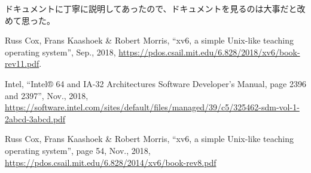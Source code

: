 \documentclass[10pt,a4j]{jarticle}
\begin{document}
ドキュメントに丁寧に説明してあったので、ドキュメントを見るのは大事だと改めて思った。


\begin{thebibliography}{10}


Russ Cox, Frans Kaashoek \& Robert Morris,
``xv6, a simple Unix-like teaching operating system'', Sep., 2018,
\url{https://pdos.csail.mit.edu/6.828/2018/xv6/book-rev11.pdf}.

Intel,
``Intel® 64 and IA-32 Architectures Software Developer's Manual, page 2396 and 2397'', Nov., 2018,
\url{https://software.intel.com/sites/default/files/managed/39/c5/325462-sdm-vol-1-2abcd-3abcd.pdf}

Russ Cox, Frans Kaashoek \& Robert Morris,
``xv6, a simple Unix-like teaching operating system'', page 54, Nov., 2018,
\url{https://pdos.csail.mit.edu/6.828/2014/xv6/book-rev8.pdf}

\end{thebibliography}
\end{document}
